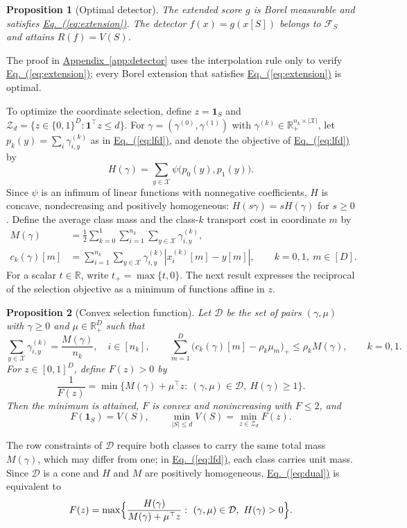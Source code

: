 \documentclass[11pt,a4paper]{article}
\newcommand{\Eqref}[1]{\hyperref[#1]{Eq.~(\ref*{#1})}}
\newcommand{\Appref}[1]{\hyperref[#1]{Appendix~\ref*{#1}}}
\theoremstyle{plain}
\newtheorem{proposition}{Proposition}[section]
\begin{document}
\begin{proposition}[Optimal detector]\label{prop:detector}
The extended score $g$ is Borel measurable and satisfies
\Eqref{eq:extension}. The detector $f(x)=g(x[S])$ belongs to
$\mathcal F_S$ and attains $R(f)=V(S)$.
\end{proposition}
The proof in \Appref{app:detector} uses the interpolation rule only to
verify \Eqref{eq:extension}; every Borel extension that satisfies
\Eqref{eq:extension} is optimal.

To optimize the coordinate selection, define $z=\mathbf1_S$ and
$\mathcal Z_d=\{z\in\{0,1\}^D:\mathbf1^\top z\le d\}$.
For $\gamma=(\gamma^{(0)},\gamma^{(1)})$ with
$\gamma^{(k)}\in\mathbb R_+^{n_k\times|\mathcal X|}$, let
$p_k(y)=\sum_i\gamma_{i,y}^{(k)}$ as in \Eqref{eq:lfd}, and denote the
objective of \Eqref{eq:lfd} by
\[
H(\gamma)=\sum_{y\in\mathcal X}\psi\bigl(p_0(y),p_1(y)\bigr).
\]
Since $\psi$ is an infimum of linear functions with nonnegative
coefficients, $H$ is concave, nondecreasing and positively homogeneous:
$H(s\gamma)=sH(\gamma)$ for $s\ge0$. Define the average class mass and
the class-$k$ transport cost in coordinate $m$ by
\[
\begin{aligned}
M(\gamma)&=\frac12\sum_{k=0}^1\sum_{i=1}^{n_k}
\sum_{y\in\mathcal X}\gamma_{i,y}^{(k)},\\
c_k(\gamma)[m]&=\sum_{i=1}^{n_k}\sum_{y\in\mathcal X}
\gamma_{i,y}^{(k)}|x_i^{(k)}[m]-y[m]|,
\qquad k=0,1,\ m\in[D].
\end{aligned}
\]
For a scalar $t\in\mathbb R$, write $t_+=\max\{t,0\}$.
The next result expresses the reciprocal of the selection objective as
a minimum of functions affine in $z$.

\begin{proposition}[Convex selection function]\label{prop:dual}
Let $\mathcal D$ be the set of pairs $(\gamma,\mu)$ with $\gamma\ge0$
and $\mu\in\mathbb R_+^D$ such that
\[
\sum_{y\in\mathcal X}\gamma_{i,y}^{(k)}=\frac{M(\gamma)}{n_k},
\quad i\in[n_k],\qquad
\sum_{m=1}^D\bigl(c_k(\gamma)[m]-\rho_k\mu_m\bigr)_+\le\rho_kM(\gamma),
\qquad k=0,1.
\]
For $z\in[0,1]^D$, define $F(z)>0$ by
\begin{equation}\label{eq:dual}
\frac1{F(z)}=\min\bigl\{M(\gamma)+\mu^\top z:\
(\gamma,\mu)\in\mathcal D,\ H(\gamma)\ge1\bigr\}.
\end{equation}
Then the minimum is attained, $F$ is convex and nonincreasing with
$F\le2$, and
\begin{equation}\label{eq:binary-exact}
F(\mathbf1_S)=V(S),\qquad
\min_{|S|\le d}V(S)=\min_{z\in\mathcal Z_d}F(z).
\end{equation}
\end{proposition}
The row constraints of $\mathcal D$ require both classes to carry the
same total mass $M(\gamma)$, which may differ from one; in
\Eqref{eq:lfd}, each class carries unit mass. Since $\mathcal D$ is a
cone and $H$ and $M$ are positively homogeneous, \Eqref{eq:dual} is
equivalent to
\[
F(z)=\max\Bigl\{\frac{H(\gamma)}{M(\gamma)+\mu^\top z}:\
(\gamma,\mu)\in\mathcal D,\ H(\gamma)>0\Bigr\}.
\]
\end{document}
